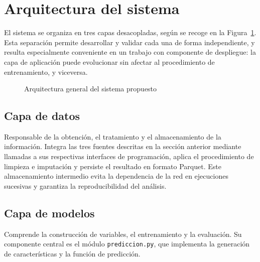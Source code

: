 


\section{Arquitectura del sistema}

El sistema se organiza en tres capas desacopladas, según se recoge en la
Figura~\ref{fig:arquitectura}. Esta separación permite desarrollar y validar cada
una de forma independiente, y resulta especialmente conveniente en un trabajo con
componente de despliegue: la capa de aplicación puede evolucionar sin afectar al
procedimiento de entrenamiento, y viceversa.

\begin{figure}[H]
\centering
\caption{Arquitectura general del sistema propuesto}
\label{fig:arquitectura}
\end{figure}

\subsection*{Capa de datos}

Responsable de la obtención, el tratamiento y el almacenamiento de la información.
Integra las tres fuentes descritas en la sección anterior mediante llamadas a sus
respectivas interfaces de programación, aplica el procedimiento de limpieza e
imputación y persiste el resultado en formato Parquet. Este almacenamiento
intermedio evita la dependencia de la red en ejecuciones sucesivas y garantiza la
reproducibilidad del análisis.

\subsection*{Capa de modelos}

Comprende la construcción de variables, el entrenamiento y la evaluación. Su
componente central es el módulo \texttt{prediccion.py}, que implementa la
generación de características y la función de predicción.

